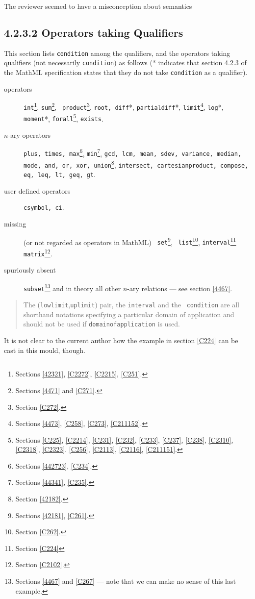 \documentclass{llncs}
\begin{document}
\begin{newpart}{The reviewer seemed to have a misconception about semantics}
\subsection{4.2.3.2 Operators taking Qualifiers}\label{4232}
This section lists {\tt condition} among the qualifiers, and the operators
taking qualifiers (not necessarily {\tt condition}) as follows (* indicates
that section 4.2.3 of the MathML specification states that they do not take
{\tt condition} as a qualifier).
\begin{description}
\item[operators]{\tt int}\footnote{Sections \ref{42321}, \ref{C2272},
\ref{C2215}, \ref{C251}.}, {\tt sum}\footnote{Sections \ref{4471} and \ref{C271}.}, {\tt
product}\footnote{Section \ref{C272}.}, {\tt root, diff}*, {\tt partialdiff}*,
{\tt limit}\footnote{Sections \ref{4473}, \ref{C258}, \ref{C273}, \ref{C211152}.}, {\tt log}*,
{\tt moment}*, {\tt forall}\footnote{Sections
\ref{C225}, \ref{C2214}, \ref{C231}, \ref{C232}, \ref{C233}, \ref{C237},
\ref{C238}, \ref{C2310}, \ref{C2318}, \ref{C2323}. \ref{C256}, \ref{C2113},
\ref{C2116}, \ref{C211151}.}, {\tt exists}.
\item[$n$-ary operators]{\tt plus, times, max}\footnote{Sections \ref{442723},
\ref{C234}.},
{\tt min}\footnote{Sections \ref{44341}, \ref{C235}.}, {\tt gcd, lcm, mean, sdev,
variance, median, mode, and, or, xor, union}\footnote{Section \ref{42182}.},
{\tt intersect, cartesianproduct, compose, eq, leq, lt, geq, gt}.
\item[user defined operators]{\tt csymbol, ci}.
\item[missing](or not regarded as operators in MathML) {\tt
set}\footnote{Sections \ref{42181}, \ref{C261}.}, {\tt
list}\footnote{Section \ref{C262}.}, {\tt interval}\footnote{Section
\ref{C224}} {\tt matrix}\footnote{Section \ref{C2102}.}.
\item[spuriously absent]{\tt subset}\footnote{Sections \ref{4467} and
\ref{C267} --- note that we can make no sense of this last example.} and in
theory all other $n$-ary relations --- see section \ref{4467}.
\end{description}
\begin{quotation}\noindent
The ({\tt lowlimit},{\tt uplimit}) pair, the {\tt interval} and the {\tt
condition} are all shorthand notations specifying a particular domain of
application and should not be used if {\tt domainofapplication} is used.
\end{quotation}
It is not clear to the current author how the example in section \ref{C224}
can be cast in this mould, though.

\end{newpart}
\end{document}
